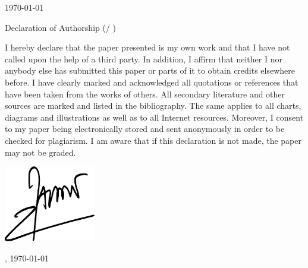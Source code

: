 \documentclass[
    12pt	%
    ]{article}
\begin{document}
  
\begin{titlepage}
\begin{center}

{\Large \EMBACourse}
\vspace{1cm}

{\large \EMBALecturer}
\vspace{2cm}

{\EMBATestType}

{\EMBAParticipant}

{\EMBAClass}

\vspace{1cm}

\today

\vspace{2cm}

Declaration of Authorship (\EMBACourse / \EMBATestType)
\vspace{0.5cm}

I hereby declare that the paper presented is my own work and that I
have not called upon the help of a third party. In addition, I affirm
that neither I nor anybody else has submitted this paper or parts of
it to obtain credits elsewhere before. I have clearly marked and
acknowledged all quotations or references that have been taken from
the works of others. All secondary literature and other sources are
marked and listed in the bibliography. The same applies to all charts,
diagrams and illustrations as well as to all Internet
resources. Moreover, I consent to my paper being electronically stored
and sent anonymously in order to be checked for plagiarism.  I am
aware that if this declaration is not made, the paper may not be
graded.

\vspace{1cm}
\includegraphics[width=4cm] {img/signature.png}
\vspace{.1cm}

{\EMBAParticipant}

{\EMBALocation, \today}

\end{center}

\end{titlepage}
\end{document}
